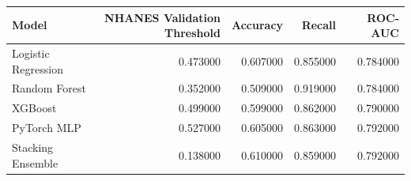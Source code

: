 \begin{tabular}{lrrrr}
\toprule
Model & NHANES Validation Threshold & Accuracy & Recall & ROC-AUC \\
\midrule
Logistic Regression & 0.473000 & 0.607000 & 0.855000 & 0.784000 \\
Random Forest & 0.352000 & 0.509000 & 0.919000 & 0.784000 \\
XGBoost & 0.499000 & 0.599000 & 0.862000 & 0.790000 \\
PyTorch MLP & 0.527000 & 0.605000 & 0.863000 & 0.792000 \\
Stacking Ensemble & 0.138000 & 0.610000 & 0.859000 & 0.792000 \\
\bottomrule
\end{tabular}
